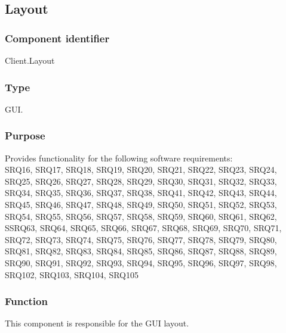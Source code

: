 \subsection{Layout}

\subsubsection*{Component identifier}
Client.Layout

\subsubsection*{Type}
GUI.

\subsubsection*{Purpose}
Provides functionality for the following software requirements:\\
SRQ16, SRQ17, SRQ18, SRQ19, SRQ20, SRQ21, SRQ22, SRQ23, SRQ24, SRQ25, SRQ26, SRQ27, SRQ28, SRQ29, SRQ30, SRQ31, SRQ32, SRQ33, SRQ34, SRQ35, SRQ36, SRQ37, SRQ38, SRQ41, SRQ42, SRQ43, SRQ44, SRQ45, SRQ46, SRQ47, SRQ48, SRQ49, SRQ50, SRQ51, SRQ52, SRQ53, SRQ54, SRQ55, SRQ56, SRQ57, SRQ58, SRQ59, SRQ60, SRQ61, SRQ62, SSRQ63, SRQ64, SRQ65, SRQ66, SRQ67, SRQ68, SRQ69, SRQ70, SRQ71, SRQ72, SRQ73, SRQ74, SRQ75, SRQ76, SRQ77, SRQ78, SRQ79, SRQ80, SRQ81, SRQ82, SRQ83, SRQ84, SRQ85, SRQ86, SRQ87, SRQ88, SRQ89, SRQ90, SRQ91, SRQ92, SRQ93, SRQ94, SRQ95, SRQ96, SRQ97, SRQ98, SRQ102, SRQ103, SRQ104, SRQ105

\subsubsection*{Function}
This component is responsible for the GUI layout.

